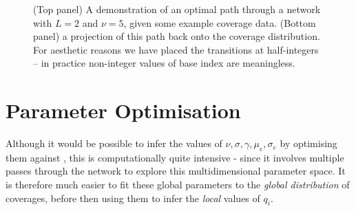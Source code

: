 \documentclass[fleqn,usenatbib]{mnras}
\begin{document}
\begin{figure}
\begin{center}
{
						}
						\caption{(Top panel) A demonstration of an optimal path through a network with $L=2$ and $\nu=5$, given some example coverage data. (Bottom panel) a projection of this path back onto the coverage distribution. For aesthetic reasons we have placed the transitions at half-integers -- in practice non-integer values of base index are meaningless.}\label{F:Path}
					\end{center}
				\end{figure}



		\appendix


		\section{Parameter Optimisation}


			Although it would be possible to infer the values of $\nu, \sigma,\gamma,\mu_e,\sigma_e$ by optimising them against , this is computationally quite intensive - since it involves multiple passes through the network to explore this multidimensional parameter space. It is therefore much easier to fit these global parameters to the \textit{global distribution} of coverages, before then using them to infer the \textit{local} values of $q_i$.
\end{document}
